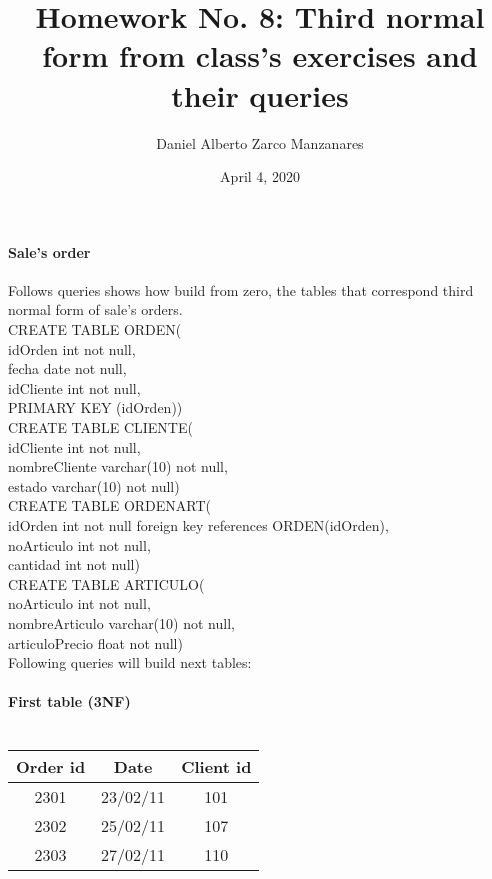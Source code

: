 \documentclass{article}
\begin{document}
\title{Homework No. 8: Third normal form from class's exercises and their queries} 
\author{Daniel Alberto Zarco Manzanares}
\date{April 4, 2020}
\maketitle
\paragraph{Sale's order\\}
Follows queries shows how build from zero, the tables that correspond third normal form of sale's orders.\\

CREATE TABLE ORDEN(\\
idOrden int not null,\\
fecha date not null,\\
idCliente int not null,\\
PRIMARY KEY (idOrden))\\

CREATE TABLE CLIENTE(\\
idCliente int not null,\\
nombreCliente varchar(10) not null,\\
estado varchar(10) not null)\\

CREATE TABLE ORDENART(\\
idOrden int not null foreign key references ORDEN(idOrden),\\
noArticulo int not null,\\
cantidad int not null)\\

CREATE TABLE ARTICULO(\\
noArticulo int not null,\\
nombreArticulo varchar(10) not null,\\
articuloPrecio float not null)\\
Following queries will build next tables:
\paragraph{First table (3NF)\\\\}
\begin{tabular}{|c|c|c|}
Order id & Date & Client id\\
\hline
2301 & 23/02/11 & 101\\
2302 & 25/02/11 & 107\\
2303 & 27/02/11 & 110\\
\end{tabular}
\end{document}
